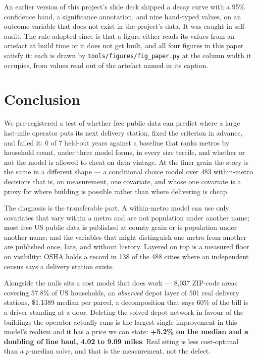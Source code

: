 \documentclass[conference]{IEEEtran}
\begin{document}
An earlier version of this project's slide deck shipped a decay curve with a
95\% confidence band, a significance annotation, and nine hand-typed values, on
an outcome variable that does not exist in the project's data. It was caught in
self-audit. The rule adopted since is that a figure either reads its values
from an artefact at build time or it does not get built, and all four figures
in this paper satisfy it: each is drawn by \texttt{tools/figures/fig\_paper.py}
at the column width it occupies, from values read out of the artefact named in
its caption.

\section{Conclusion}

We pre-registered a test of whether free public data can predict where a large
last-mile operator puts its next delivery station, fixed the criterion in
advance, and failed it: 0 of 7 held-out years against a baseline that ranks
metros by household count, under three model forms, in every size tercile, and
whether or not the model is allowed to cheat on data vintage. At the finer
grain the story is the same in a different shape --- a conditional choice model
over 483 within-metro decisions that is, on measurement, one covariate, and
whose one covariate is a proxy for where building is possible rather than where
delivering is cheap.

The diagnosis is the transferable part. A within-metro model can use only
covariates that vary within a metro and are not population under another name;
most free US public data is published at county grain or is population under
another name; and the variables that might distinguish one metro from another
are published once, late, and without history. Layered on top is a measured
floor on visibility: OSHA holds a record in 138 of the 488 cities where an
independent census says a delivery station exists.

Alongside the nulls sits a cost model that does work --- 8{,}037 ZIP-code
areas covering 57.8\% of US households, an \emph{observed} depot layer of 501
real delivery stations, \$1.1389 median per parcel, a decomposition that says
60\% of the bill is a driver standing at a door. Deleting the solved depot
network in favour of the buildings the operator actually runs is the largest
single improvement in this model's realism and it has a price we can state:
\textbf{+5.2\% on the median and a doubling of line haul, 4.02 to 9.09 miles}.
Real siting is less cost-optimal than a $p$-median solve, and that is the
measurement, not the defect.
\end{document}
